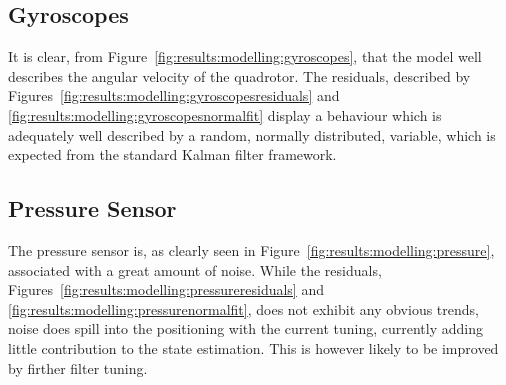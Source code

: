     \subsection{Gyroscopes}
        \label{ssec:results:modelling:gyroscopes}
        It is clear, from Figure~\ref{fig:results:modelling:gyroscopes}, that
        the model well describes the angular velocity of the quadrotor.
        The residuals, described by Figures~\ref{fig:results:modelling:gyroscopesresiduals}
        and \ref{fig:results:modelling:gyroscopesnormalfit}
        display a behaviour which is adequately well described by a random,
        normally distributed, variable, which is expected from the
        standard Kalman filter framework.

    \subsection{Pressure Sensor}
        The pressure sensor is, as clearly seen in Figure~\ref{fig:results:modelling:pressure},
        associated with a great amount of noise. While the residuals,
        Figures~\ref{fig:results:modelling:pressureresiduals} and \ref{fig:results:modelling:pressurenormalfit},
        does not exhibit any obvious trends, noise does spill into
        the positioning with the current tuning, currently adding little contribution
        to the state estimation. This is however likely to be improved by firther filter tuning.

